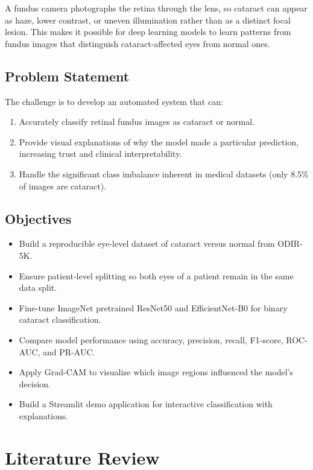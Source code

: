 \documentclass[12pt, a4paper]{article}
\begin{document}
A fundus camera photographs the retina through the lens, so cataract can appear as haze, lower contrast, or uneven illumination rather than as a distinct focal lesion. This makes it possible for deep learning models to learn patterns from fundus images that distinguish cataract-affected eyes from normal ones.

\subsection{Problem Statement}
The challenge is to develop an automated system that can:
\begin{enumerate}
    \item Accurately classify retinal fundus images as cataract or normal.
    \item Provide visual explanations of why the model made a particular prediction, increasing trust and clinical interpretability.
    \item Handle the significant class imbalance inherent in medical datasets (only 8.5\% of images are cataract).
\end{enumerate}

\subsection{Objectives}
\begin{itemize}
    \item Build a reproducible eye-level dataset of cataract versus normal from ODIR-5K.
    \item Ensure patient-level splitting so both eyes of a patient remain in the same data split.
    \item Fine-tune ImageNet pretrained ResNet50 and EfficientNet-B0 for binary cataract classification.
    \item Compare model performance using accuracy, precision, recall, F1-score, ROC-AUC, and PR-AUC.
    \item Apply Grad-CAM to visualize which image regions influenced the model's decision.
    \item Build a Streamlit demo application for interactive classification with explanations.
\end{itemize}

\section{Literature Review}
\end{document}
